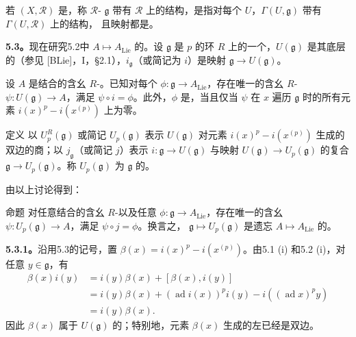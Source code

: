 若 $(X,\mathcal R)$ 是，称 $\mathcal R$- $\mathfrak g$ 带有 $\mathcal R$ 上的结构，是指对每个 $U$，$\Gamma(U,\mathfrak g)$ 带有 $\Gamma(U,\mathcal R)$ 上的结构，
且映射都是。

\textbf{5.3。}现在研究5.2中 $A\mapsto A_{\mathrm{Lie}}$ 的。设 $\mathfrak g$ 是 $p$ 的环 $R$ 上的一个，$U(\mathfrak g)$ 是其底层的（参见 [BLie]，I，\S2.1），$i_{\mathfrak g}$（或简记为 $i$）是映射 $\mathfrak g\to U(\mathfrak g)$。

设 $A$ 是结合的含幺 $R$-。已知对每个 $\phi:\mathfrak g\to A_{\mathrm{Lie}}$，存在唯一的含幺 $R$- $\psi:U(\mathfrak g)\to A$，满足 $\psi\circ i=\phi$。此外，$\phi$ 是，当且仅当 $\psi$ 在 $x$ 遍历 $\mathfrak g$ 时的所有元素 $i(x)^p-i(x^{(p)})$ 上为零。

\begin{SGAresult}{定义}{}
以 $U_p^R(\mathfrak g)$ 或简记 $U_p(\mathfrak g)$ 表示 $U(\mathfrak g)$ 对元素 $i(x)^p-i(x^{(p)})$ 生成的双边的商；以 $j_{\mathfrak g}$（或简记 $j$）表示 $i:\mathfrak g\to U(\mathfrak g)$ 与映射 $U(\mathfrak g)\to U_p(\mathfrak g)$ 的复合 $\mathfrak g\to U_p(\mathfrak g)$。称 $U_p(\mathfrak g)$ 为 $\mathfrak g$ 的。
\end{SGAresult}
由以上讨论得到：
\begin{SGAresult}{命题}{}
对任意结合的含幺 $R$-以及任意 $\phi:\mathfrak g\to A_{\mathrm{Lie}}$，存在唯一的含幺 $\psi:U_p(\mathfrak g)\to A$，满足 $\psi\circ j=\phi$。换言之， $\mathfrak g\mapsto U_p(\mathfrak g)$ 是遗忘 $A\mapsto A_{\mathrm{Lie}}$ 的。
\end{SGAresult}

\textbf{5.3.1。}沿用5.3的记号，置 $\beta(x)=i(x)^p-i(x^{(p)})$。由5.1 (i) 和5.2 (i)，对任意 $y\in\mathfrak g$，有
\[
\begin{aligned}
 \beta(x)i(y)&=i(y)\beta(x)+[\beta(x),i(y)]\\
 &=i(y)\beta(x)+(\operatorname{ad}i(x))^pi(y)-i((\operatorname{ad}x)^py)\\
 &=i(y)\beta(x).
\end{aligned}
\]
因此 $\beta(x)$ 属于 $U(\mathfrak g)$ 的；特别地，元素 $\beta(x)$ 生成的左已经是双边。

